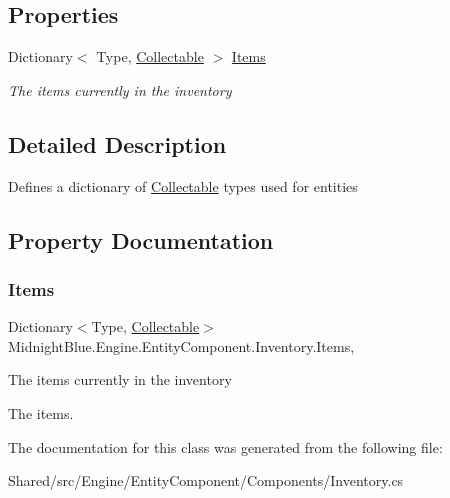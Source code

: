 \subsection*{Properties}
\begin{DoxyCompactItemize}
\item 
Dictionary$<$ Type, \hyperlink{class_midnight_blue_1_1_engine_1_1_collectable}{Collectable} $>$ \hyperlink{class_midnight_blue_1_1_engine_1_1_entity_component_1_1_inventory_a3630396d2c21fd0ccf244999be980f33}{Items}
\begin{DoxyCompactList}\small\item\em The items currently in the inventory \end{DoxyCompactList}\end{DoxyCompactItemize}


\subsection{Detailed Description}
Defines a dictionary of \hyperlink{class_midnight_blue_1_1_engine_1_1_collectable}{Collectable} types used for entities 



\subsection{Property Documentation}
\hypertarget{class_midnight_blue_1_1_engine_1_1_entity_component_1_1_inventory_a3630396d2c21fd0ccf244999be980f33}{}\label{class_midnight_blue_1_1_engine_1_1_entity_component_1_1_inventory_a3630396d2c21fd0ccf244999be980f33} 
\subsubsection{\texorpdfstring{Items}{Items}}
{\footnotesize\ttfamily Dictionary$<$Type, \hyperlink{class_midnight_blue_1_1_engine_1_1_collectable}{Collectable}$>$ Midnight\+Blue.\+Engine.\+Entity\+Component.\+Inventory.\+Items\hspace{0.3cm}{\ttfamily [get]}, {\ttfamily [set]}}



The items currently in the inventory 

The items.

The documentation for this class was generated from the following file\+:\begin{DoxyCompactItemize}
\item 
Shared/src/\+Engine/\+Entity\+Component/\+Components/Inventory.\+cs\end{DoxyCompactItemize}
